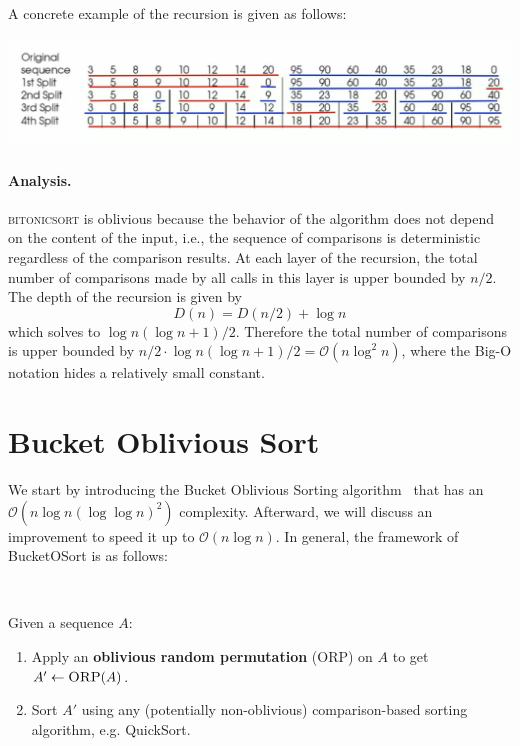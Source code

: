 A concrete example of the recursion is given as follows:

\includegraphics[scale=0.27]{fig1.png}

\paragraph{Analysis.} \textsc{bitonicsort} is oblivious because the behavior of the algorithm does not depend on the content of the input, i.e., the sequence of comparisons is deterministic regardless of the comparison results. At each layer of the recursion, the total number of comparisons made by all calls in this layer is upper bounded by $n/2$. The depth of the recursion is given by \[D(n)  = D(n/2) + \log n \] which solves to $\log n (\log n+1)/2$. Therefore the total number of comparisons is upper bounded by $n/2 \cdot \log n (\log n+1)/2 = \mathcal{O}(n \log^2 n)$, where the Big-O notation hides a relatively small constant.

\section{Bucket Oblivious Sort}

We start by introducing the Bucket Oblivious Sorting algorithm~\cite{bucket} that has an $\mathcal{O}(n\log n (\log\log n)^2)$ complexity. Afterward, we will discuss an improvement to speed it up to $\mathcal{O}(n\log n)$. In general, the framework of BucketOSort is as follows: 

$ $

\begin{mdframed}[innertopmargin=5pt, skipabove=\topskip, skipbelow=\topskip,align=left]


Given a sequence $A$:
\begin{enumerate}
    \item Apply an \textbf{oblivious random permutation} (\textsc{ORP}) on $A$ to get $A' \gets \textsc{ORP}(A)$.
    \item Sort $A'$ using any (potentially non-oblivious) comparison-based sorting algorithm, e.g. QuickSort.
\end{enumerate}
\end{mdframed}

